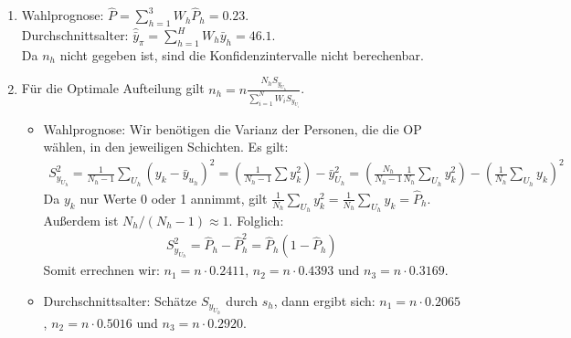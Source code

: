 \documentclass{article}
\begin{document}
\begin{solution}
	\begin{enumerate}
\item Wahlprognose: $\hat{P} = \sum_{h=1}^3 W_h \hat{P}_h = 0.23$.\\
Durchschnittsalter: $\hat{\bar{y}}_\pi=\sum_{h=1}^H W_h \bar{y}_h=46.1$.\\
Da $n_h$ nicht gegeben ist, sind die Konfidenzintervalle nicht berechenbar.
\item Für die Optimale Aufteilung gilt $n_h = n \frac{N_h S_{y_{U_h}}}{\sum_{i=1}^N W_i S_{y_{U_i}}}$.\\
\begin{itemize}
\item Wahlprognose: Wir benötigen die Varianz der Personen, die die OP wählen, in den jeweiligen Schichten. Es gilt:
\begin{align*}
S_{y_{U_h}}^2 = \frac{1}{N_h-1}\sum_{U_h}(y_k - \bar{y}_{u_h})^2 = \left(\frac{1}{N_h-1}\sum y_k^2\right) -\bar{y}_{U_h}^2 = \left(\frac{N_h}{N_h-1} \frac{1}{N_h}\sum_{U_h} y_k^2\right) - \left(\frac{1}{N_h}\sum_{U_h}y_k\right)^2
\end{align*}
Da $y_k$ nur Werte 0 oder 1 annimmt, gilt $\frac{1}{N_h}\sum_{U_h} y_k^2=\frac{1}{N_h}\sum_{U_h} y_k = \hat{P}_h$. Außerdem ist $N_h/(N_h-1)\approx 1$. Folglich:
\begin{align*}
S_{y_{U_h}}^2 = \hat{P}_h - \hat{P}_h^2 = \hat{P}_h(1-\hat{P}_h)
\end{align*}
Somit errechnen wir: $n_1= n\cdot 0.2411$, $n_2= n\cdot 0.4393$ und $n_3= n\cdot 0.3169$.

\item Durchschnittsalter: Schätze $S_{y_{U_h}}$ durch $s_h$, dann ergibt sich:
$n_1 = n\cdot 0.2065$, $n_2 = n\cdot 0.5016$ und $n_3 = n\cdot 0.2920$.
\end{itemize}
\end{enumerate}
\end{solution}
\end{document}
